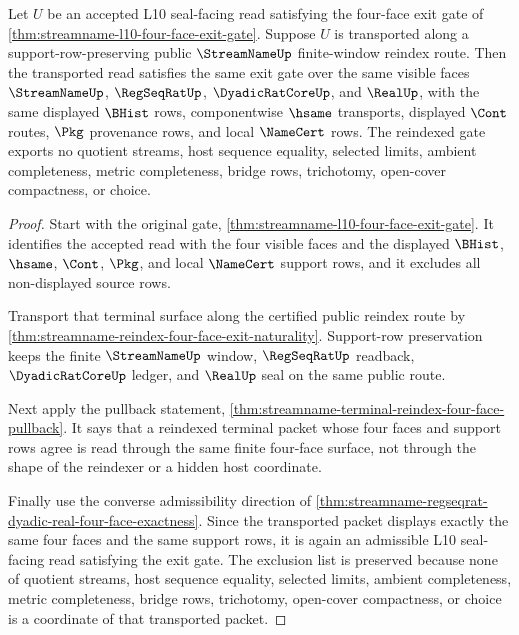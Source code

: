 \begin{theorem}
\label{thm:streamname-l10-four-face-exit-gate-reindex-stability}
Let $U$ be an accepted L10 seal-facing read satisfying the four-face exit gate of \autoref{thm:streamname-l10-four-face-exit-gate}. Suppose $U$ is transported along a support-row-preserving public $\StreamNameUp$ finite-window reindex route. Then the transported read satisfies the same exit gate over the same visible faces $\StreamNameUp$, $\RegSeqRatUp$, $\DyadicRatCoreUp$, and $\RealUp$, with the same displayed $\BHist$ rows, componentwise $\hsame$ transports, displayed $\Cont$ routes, $\Pkg$ provenance rows, and local $\NameCert$ rows. The reindexed gate exports no quotient streams, host sequence equality, selected limits, ambient completeness, metric completeness, bridge rows, trichotomy, open-cover compactness, or choice.
\end{theorem}
\begin{proof}
Start with the original gate, \autoref{thm:streamname-l10-four-face-exit-gate}. It identifies the accepted read with the four visible faces and the displayed $\BHist$, $\hsame$, $\Cont$, $\Pkg$, and local $\NameCert$ support rows, and it excludes all non-displayed source rows.

Transport that terminal surface along the certified public reindex route by \autoref{thm:streamname-reindex-four-face-exit-naturality}. Support-row preservation keeps the finite $\StreamNameUp$ window, $\RegSeqRatUp$ readback, $\DyadicRatCoreUp$ ledger, and $\RealUp$ seal on the same public route.

Next apply the pullback statement, \autoref{thm:streamname-terminal-reindex-four-face-pullback}. It says that a reindexed terminal packet whose four faces and support rows agree is read through the same finite four-face surface, not through the shape of the reindexer or a hidden host coordinate.

Finally use the converse admissibility direction of \autoref{thm:streamname-regseqrat-dyadic-real-four-face-exactness}. Since the transported packet displays exactly the same four faces and the same support rows, it is again an admissible L10 seal-facing read satisfying the exit gate. The exclusion list is preserved because none of quotient streams, host sequence equality, selected limits, ambient completeness, metric completeness, bridge rows, trichotomy, open-cover compactness, or choice is a coordinate of that transported packet.
\end{proof}

